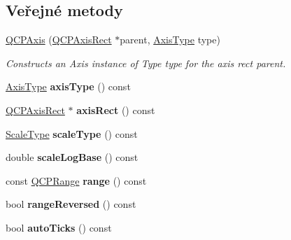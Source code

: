 \subsection*{Veřejné metody}
\begin{DoxyCompactItemize}
\item 
\hyperlink{classQCPAxis_ac62c042968bae0e6d474fcfc57c9b71f}{Q\+C\+P\+Axis} (\hyperlink{classQCPAxisRect}{Q\+C\+P\+Axis\+Rect} $\ast$parent, \hyperlink{classQCPAxis_ae2bcc1728b382f10f064612b368bc18a}{Axis\+Type} type)
\begin{DoxyCompactList}\small\item\em Constructs an Axis instance of Type {\itshape type} for the axis rect {\itshape parent}. \end{DoxyCompactList}\item 
\hypertarget{classQCPAxis_a593c37bf6aa4990326dc09e24f45db7f}{}\hyperlink{classQCPAxis_ae2bcc1728b382f10f064612b368bc18a}{Axis\+Type} {\bfseries axis\+Type} () const \label{classQCPAxis_a593c37bf6aa4990326dc09e24f45db7f}

\item 
\hypertarget{classQCPAxis_aada3102af43b029e3879bcbf2bddfabb}{}\hyperlink{classQCPAxisRect}{Q\+C\+P\+Axis\+Rect} $\ast$ {\bfseries axis\+Rect} () const \label{classQCPAxis_aada3102af43b029e3879bcbf2bddfabb}

\item 
\hypertarget{classQCPAxis_a8563e13407bc0616da7f7c84e02de170}{}\hyperlink{classQCPAxis_a36d8e8658dbaa179bf2aeb973db2d6f0}{Scale\+Type} {\bfseries scale\+Type} () const \label{classQCPAxis_a8563e13407bc0616da7f7c84e02de170}

\item 
\hypertarget{classQCPAxis_ac937d2a602f865aff2ab6c1e288739f6}{}double {\bfseries scale\+Log\+Base} () const \label{classQCPAxis_ac937d2a602f865aff2ab6c1e288739f6}

\item 
\hypertarget{classQCPAxis_ab1ea79a4f5ea4cf42620f8f51c477ac4}{}const \hyperlink{classQCPRange}{Q\+C\+P\+Range} {\bfseries range} () const \label{classQCPAxis_ab1ea79a4f5ea4cf42620f8f51c477ac4}

\item 
\hypertarget{classQCPAxis_ade26dc7994ccd8a11f64fd83377ee021}{}bool {\bfseries range\+Reversed} () const \label{classQCPAxis_ade26dc7994ccd8a11f64fd83377ee021}

\item 
\hypertarget{classQCPAxis_afc7f20e30dc2865ff6c39f3281f330c2}{}bool {\bfseries auto\+Ticks} () const \label{classQCPAxis_afc7f20e30dc2865ff6c39f3281f330c2}


\end{DoxyCompactItemize}
